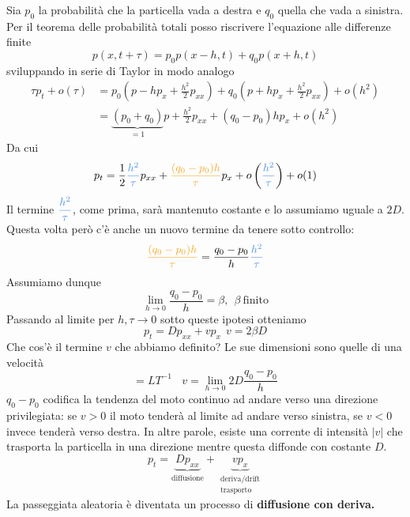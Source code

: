 \documentclass[10pt,a4paper,twoside,openright]{book}
\begin{document}
Sia $\displaystyle p_{0}$ la probabilità che la particella vada a destra e $\displaystyle q_{0}$ quella che vada a sinistra. Per il teorema delle probabilità totali posso riscrivere l'equazione alle differenze finite
\begin{equation*}
p(x,t+\tau) =p_{0} p(x-h,t) +q_{0} p(x+h,t)
\end{equation*}
sviluppando in serie di Taylor in modo analogo
\begin{align*}
\tau p_{t} +o(\tau) & =p_{0}\left( p-hp_{x} +\frac{h^{2}}{2} p_{xx}\right) +q_{0}\left( p+hp_{x} +\frac{h^{2}}{2} p_{xx}\right) +o\left(h^{2}\right)\\
 & =\underbrace{(p_{0} +q_{0})}_{=1} p+\frac{h^{2}}{2} p_{xx} +(q_{0} -p_{0}) hp_{x} +o\left(h^{2}\right)
\end{align*}
Da cui
\begin{equation*}
p_{t} =\frac{1}{2}\textcolor[rgb]{0.29,0.56,0.89}{\frac{h^{2}}{\tau }} p_{xx} +\textcolor[rgb]{0.96,0.65,0.14}{\frac{(q_{0} -p_{0}) h}{\tau }} p_{x} +o\left(\textcolor[rgb]{0.29,0.56,0.89}{\frac{h^{2}}{\tau }}\right) +o(1)
\end{equation*}
Il termine $\displaystyle \textcolor[rgb]{0.29,0.56,0.89}{\frac{h^{2}}{\tau }}$, come prima, sarà mantenuto costante e lo assumiamo uguale a $\displaystyle 2D$. Questa volta però c'è anche un nuovo termine da tenere sotto controllo:
\begin{equation*}
\textcolor[rgb]{0.96,0.65,0.14}{\frac{(q_{0} -p_{0}) h}{\tau }}=\frac{q_{0} -p_{0}}{h}\textcolor[rgb]{0.29,0.56,0.89}{\frac{h^{2}}{\tau }}
\end{equation*}
Assumiamo dunque 
\begin{equation*}
\lim _{h\rightarrow 0}\frac{q_{0} -p_{0}}{h}=\beta,\ \ \beta \ \text{finito}
\end{equation*}
Passando al limite per $\displaystyle h,\tau \rightarrow 0$ sotto queste ipotesi otteniamo
\begin{equation*}
\boxed{p_{t} =Dp_{xx} +vp_{x}} \ \ v=2\beta D
\end{equation*}
Che cos'è il termine $\displaystyle v$ che abbiamo definito? Le sue dimensioni sono quelle di una velocità
\begin{equation*}
[ v] =LT^{-1} \ \ \ \ v=\lim _{h\rightarrow 0} 2D\frac{q_{0} -p_{0}}{h}
\end{equation*}
$\displaystyle q_{0} -p_{0}$ codifica la tendenza del moto continuo ad andare verso una direzione privilegiata: se $\displaystyle v >0$ il moto tenderà al limite ad andare verso sinistra, se $\displaystyle v< 0$ invece tenderà verso destra. In altre parole, esiste una corrente di intensità $\displaystyle | v| $ che trasporta la particella in una direzione mentre questa diffonde con costante $\displaystyle D$.
\begin{equation*}
p_{t} =\underbrace{Dp_{xx}}_{\mathrm{diffusione}} +\underbrace{vp_{x}}_{ \begin{array}{l}
\mathrm{deriva/drift}\\
\mathrm{trasporto}
\end{array}}
\end{equation*}
La passeggiata aleatoria è diventata un processo di \textbf{diffusione con deriva.}
\end{document}
